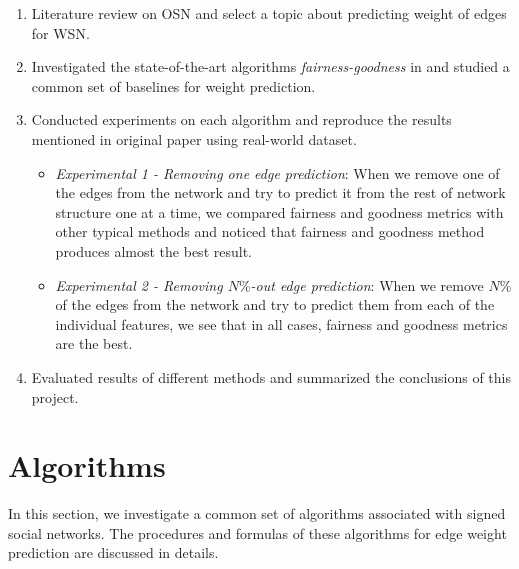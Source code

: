 \documentclass{article}
\begin{document}
\begin{enumerate}
	\item Literature review on OSN and select a topic about predicting weight of edges for WSN.
	
	\item Investigated the state-of-the-art algorithms \emph{fairness-goodness} in\cite{kumar2016edge} and  studied a common set of baselines for weight prediction.
	
	\item Conducted experiments on each algorithm and reproduce the results mentioned in original paper using real-world dataset.
  
  \begin{itemize}
    \item \emph{Experimental 1 -   Removing one edge prediction}: 
    When we remove one of the edges from the network and try to 
    predict it from the rest of network structure one at a time, 
    we compared fairness and goodness metrics with other typical 
    methods and noticed that fairness and goodness method produces 
    almost the best result. 
	
    \item \emph{Experimental 2 -  Removing $N \%$-out edge prediction}: 
    When we remove $N\%$ of the edges from the network and try to 
    predict them from each of the individual features, we see 
    that in all cases, fairness and goodness metrics are the best.
  \end{itemize}
  
  \item  Evaluated results of different methods and summarized the conclusions of this project.
	
\end{enumerate}

\section{Algorithms}

In this section, we investigate a common set of algorithms
associated with signed social networks. The procedures and
formulas of these algorithms for edge weight prediction are 
discussed in details. 








\end{document}
